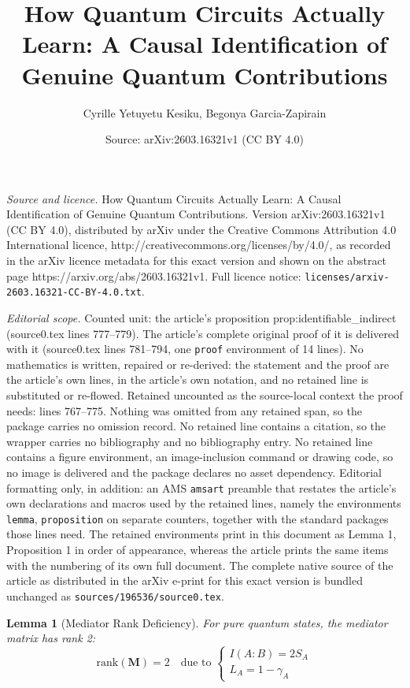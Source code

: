 \documentclass[10pt,a4paper]{amsart}
\title{How Quantum Circuits Actually Learn: A Causal Identification of Genuine Quantum Contributions}
\author{Cyrille Yetuyetu Kesiku, Begonya Garcia-Zapirain}
\date{Source: arXiv:2603.16321v1 (CC BY 4.0)}
\newtheorem{lemma}{Lemma}
\begin{document}
\maketitle

\noindent\emph{Source and licence.} How Quantum Circuits Actually Learn: A Causal Identification of Genuine Quantum Contributions. Version arXiv:2603.16321v1 (CC BY 4.0), distributed by arXiv under the Creative Commons Attribution 4.0 International licence, http://creativecommons.org/licenses/by/4.0/, as recorded in the arXiv licence metadata for this exact version and shown on the abstract page https://arxiv.org/abs/2603.16321v1. Full licence notice: \texttt{licenses/arxiv-2603.16321-CC-BY-4.0.txt}.\par\smallskip

\noindent\textit{Editorial scope.} Counted unit: the article's proposition prop:identifiable\_indirect (source0.tex lines 777--779). The article's complete original proof of it is delivered with it (source0.tex lines 781--794, one \texttt{proof} environment of 14 lines). No mathematics is written, repaired or re-derived: the statement and the proof are the article's own lines, in the article's own notation, and no retained line is substituted or re-flowed.  Retained uncounted as the source-local context the proof needs: lines 767--775.  Nothing was omitted from any retained span, so the package carries no omission record.  No retained line contains a citation, so the wrapper carries no bibliography and no bibliography entry.  No retained line contains a figure environment, an image-inclusion command or drawing code, so no image is delivered and the package declares no asset dependency.  Editorial formatting only, in addition: an AMS \texttt{amsart} preamble that restates the article's own declarations and macros used by the retained lines, namely the environments \texttt{lemma}, \texttt{proposition} on separate counters, together with the standard packages those lines need.  The retained environments print in this document as Lemma 1, Proposition 1 in order of appearance, whereas the article prints the same items with the numbering of its own full document.  The complete native source of the article as distributed in the arXiv e-print for this exact version is bundled unchanged as \texttt{sources/196536/source0.tex}.
\begin{lemma}[Mediator Rank Deficiency]\label{lem:rank_deficiency}
For pure quantum states, the mediator matrix has rank 2:
\begin{equation}
    \text{rank}(\bm{M}) = 2 \quad \text{due to } \begin{cases}
I(A:B) = 2S_A \\
L_A = 1 - \gamma_A
\end{cases}
\end{equation}
\end{lemma}
\end{document}

